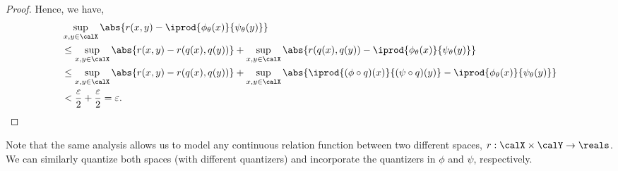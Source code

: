 \begin{proof}
Hence, we have,
\begin{equation*}
    \begin{split}
        &\sup_{x, y \in \calX} \abs{r(x, y) - \iprod{\phi_\theta(x)}{\psi_\theta(y)}} \\
        &\leq \sup_{x, y \in \calX} \abs{r(x, y) - r(q(x), q(y))} + \sup_{x, y \in \calX} \abs{r(q(x), q(y)) - \iprod{\phi_\theta(x)}{\psi_\theta(y)}} \\
        &\leq  \sup_{x, y \in \calX} \abs{r(x, y) - r(q(x), q(y))} + \sup_{x, y \in \calX} \abs{\iprod{(\phi \circ q)(x)}{(\psi \circ q)(y)} - \iprod{\phi_\theta(x)}{\psi_\theta(y)}}  \\
        &< \frac{\varepsilon}{2} + \frac{\varepsilon}{2} = \varepsilon.
    \end{split}
\end{equation*}

\end{proof}

\begin{remark}
    Note that the same analysis allows us to model any continuous relation function between two different spaces, $r: \calX \times \calY \to \reals$. We can similarly quantize both spaces (with different quantizers) and incorporate the quantizers in $\phi$ and $\psi$, respectively.
\end{remark}

